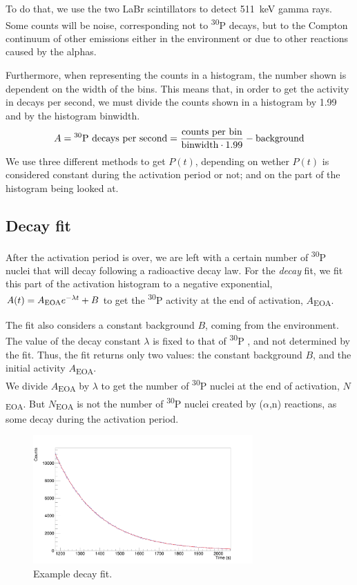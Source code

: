 \documentclass[a4paper,12pt]{report}
\newcommand{\an}{($\alpha$,n) }
\newcommand{\Piso}{\textsuperscript{30}P }
\begin{document}
To do that, we use the two LaBr scintillators to detect \qty{511}{\keV} gamma rays.
Some counts will be noise, corresponding not to \Piso decays, but to the Compton continuum of other emissions either in the environment or due to other reactions caused by the alphas.

Furthermore, when representing the counts in a histogram, the number shown is dependent on the width of the bins.
This means that, in order to get the activity in decays per second, we must divide the counts shown in a histogram by 1.99 and by the histogram binwidth.
\begin{equation}
	A = \text{\Piso decays per second} = \frac{\text{counts per bin}}{\text{binwidth}\cdot\num{1.99}} - \text{background}
\end{equation}
We use three different methods to get $P(t)$, depending on wether $P(t)$ is considered constant during the activation period or not; and on the part of the histogram being looked at.

\subsection{Decay fit}
After the activation period is over, we are left with a certain number of \Piso nuclei that will decay following a radioactive decay law.
For the \textit{decay} fit, we fit this part of the activation histogram to a negative exponential, $A(t) = A\textsubscript{EOA} e^{-\lambda t} + B$ to get the \Piso activity at the end of activation, $A$\textsubscript{EOA}.

The fit also considers a constant background $B$, coming from the environment.
The value of the decay constant $\lambda$ is fixed to that of \Piso, and not determined by the fit.
Thus, the fit returns only two values: the constant background $B$, and the initial activity $A$\textsubscript{EOA}.
\\

We divide $A$\textsubscript{EOA} by $\lambda$ to get the number of \Piso nuclei at the end of activation, $N$\textsubscript{EOA}.
But $N$\textsubscript{EOA} is not the number of \Piso nuclei created by \an reactions, as some decay during the activation period.

\begin{figure}[H]
	\centering
	\includegraphics[width=0.75\textwidth]{example_decay_fit.png}
	\caption{Example decay fit.}
	\label{example_decay_fit}
\end{figure}
\end{document}
